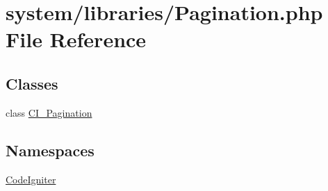 \hypertarget{_pagination_8php}{}\section{system/libraries/\+Pagination.php File Reference}
\label{_pagination_8php}
\subsection*{Classes}
\begin{DoxyCompactItemize}
\item 
class \mbox{\hyperlink{class_c_i___pagination}{C\+I\+\_\+\+Pagination}}
\end{DoxyCompactItemize}
\subsection*{Namespaces}
\begin{DoxyCompactItemize}
\item 
 \mbox{\hyperlink{namespace_code_igniter}{Code\+Igniter}}
\end{DoxyCompactItemize}
